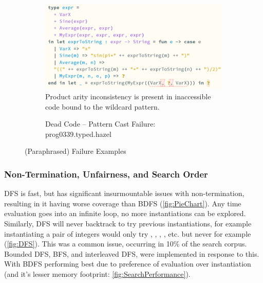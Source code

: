 \begin{figure}
\begin{subfigure}{0.7\textwidth}
\includegraphics[width=1\textwidth]{Media/Figures/dead_code_wildcard}
Product arity inconsistency is present in inaccessible code bound to the wildcard pattern.
\caption{Dead Code -- Pattern Cast Failure: prog0339.typed.hazel}
\end{subfigure}
\caption{(Paraphrased) Failure Examples}
\label{fig:FailureExamples}
\end{figure}

\label{sec:SearchCategories}
\subsubsection{Non-Termination, Unfairness, and Search Order}
DFS is fast, but has significant insurmountable issues with non-termination, resulting in it having worse coverage than BDFS (\cref{fig:PieChart}). Any time evaluation goes into an infinite loop, no more instantiations can be explored. Similarly, DFS will never backtrack to try previous instantiations, for example instantiating a pair of integers \code{(}\dyn\code{, }\dyn\code{)} would only try \dyn\code{)}, , , ,  etc. but never  for example (\cref{fig:DFS}). This was a common issue, occurring in 10\% of the search corpus. Bounded DFS, BFS, and interleaved DFS, were implemented in response to this. With BDFS performing best due to preference of evaluation over instantiation (and it's lesser memory footprint: \cref{fig:SearchPerformance}).

